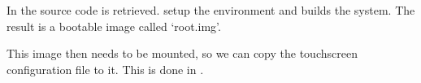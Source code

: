 In  the source code is retrieved.
 setup the environment and
 builds the system.
The result is a bootable image called `root.img'.

This image then needs to be mounted, so we can copy the touchscreen
configuration file to it. This is done in
.
